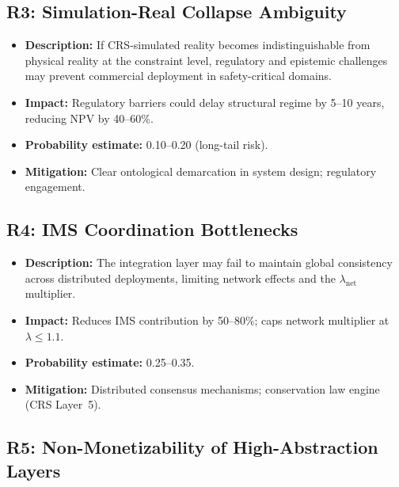 \documentclass[11pt,a4paper]{article}
\theoremstyle{remark}
\begin{document}
\subsection{R3: Simulation-Real Collapse Ambiguity}

\begin{itemize}[nosep]
  \item \textbf{Description:} If CRS-simulated reality becomes
        indistinguishable from physical reality at the constraint
        level, regulatory and epistemic challenges may prevent
        commercial deployment in safety-critical domains.
  \item \textbf{Impact:} Regulatory barriers could delay structural
        regime by 5--10 years, reducing NPV by 40--60\%.
  \item \textbf{Probability estimate:} 0.10--0.20 (long-tail risk).
  \item \textbf{Mitigation:} Clear ontological demarcation in
        system design; regulatory engagement.
\end{itemize}

\subsection{R4: IMS Coordination Bottlenecks}

\begin{itemize}[nosep]
  \item \textbf{Description:} The integration layer may fail to
        maintain global consistency across distributed deployments,
        limiting network effects and the $\lambda_{\mathrm{net}}$
        multiplier.
  \item \textbf{Impact:} Reduces IMS contribution by 50--80\%;
        caps network multiplier at $\lambda \leq 1.1$.
  \item \textbf{Probability estimate:} 0.25--0.35.
  \item \textbf{Mitigation:} Distributed consensus mechanisms;
        conservation law engine (CRS Layer~5).
\end{itemize}

\subsection{R5: Non-Monetizability of High-Abstraction Layers}
\end{document}
